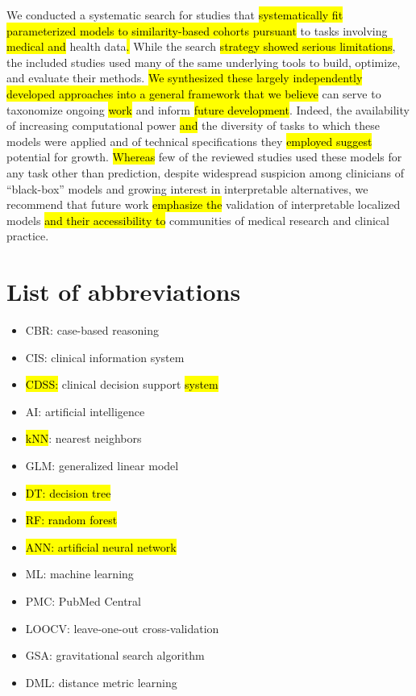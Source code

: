 \documentclass[sn-mathphys,Numbered,pdflatex]{sn-jnl}
\theoremstyle{remark}
\theoremstyle{definition}
\providecommand{\tightlist}{%
  \setlength{\itemsep}{0pt}\setlength{\parskip}{0pt}}
\begin{document}
We conducted a systematic search for studies that
\hl{systematically fit parameterized models to similarity-based cohorts pursuant}
to tasks involving \hl{medical and }health data\hl{. }While the search
\hl{strategy showed serious limitations}, the included studies used many
of the same underlying tools to build, optimize, and evaluate their
methods.
\hl{We synthesized these largely independently developed approaches into a general framework that we believe}
can serve to taxonomize ongoing \hl{work }and inform
\hl{future development}. Indeed, the availability of increasing
computational power\hl{ and} the diversity of tasks to which these
models were applied and of technical specifications they
\hl{employed suggest }potential for growth. \hl{Whereas} few of the
reviewed studies used these models for any task other than prediction,
despite widespread suspicion among clinicians of ``black-box'' models
and growing interest in interpretable alternatives, we recommend that
future work \hl{emphasize the} validation of interpretable localized
models \hl{and their accessibility to} communities of medical research
and clinical practice.

\section*{List of abbreviations}\label{list-of-abbreviations}

\begin{itemize}
\tightlist
\item
  CBR: case-based reasoning
\item
  CIS: clinical information system
\item
  \hl{CDSS:} clinical decision support\hl{ system}
\item
  AI: artificial intelligence
\item
  \hl{kNN}: nearest neighbors
\item
  GLM: generalized linear model
\item
  \hl{DT: decision tree}
\item
  \hl{RF: random forest}
\item
  \hl{ANN: artificial neural network}
\item
  ML: machine learning
\item
  PMC: PubMed Central
\item
  LOOCV: leave-one-out cross-validation
\item
  GSA: gravitational search algorithm
\item
  DML: distance metric learning
\end{itemize}
\end{document}

